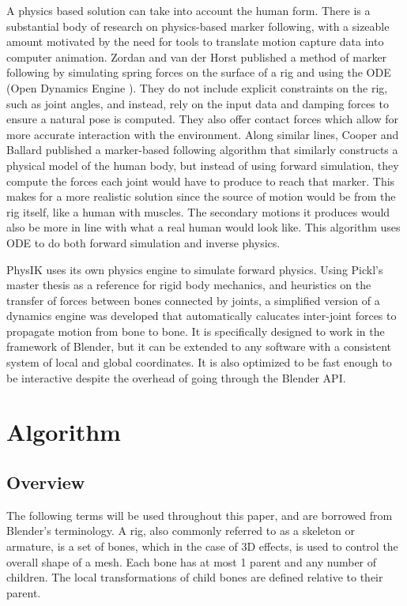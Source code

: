 \documentclass[10pt,twocolumn,letterpaper]{article}
\begin{document}
A physics based solution can take into account the human form. There is a substantial body of research on physics-based marker following, with a sizeable amount motivated by the need for tools to translate motion capture data into computer animation. Zordan and van der Horst \cite{Zo} published a method of marker following by simulating spring forces on the surface of a rig and using the ODE (Open Dynamics Engine \cite{Sm.R}). They do not include explicit constraints on the rig, such as joint angles, and instead, rely on the input data and damping forces to ensure a natural pose is computed. They also offer contact forces which allow for more accurate interaction with the environment. Along similar lines, Cooper and Ballard \cite{Co} published a marker-based following algorithm that similarly constructs a physical model of the human body, but instead of using forward simulation, they compute the forces each joint would have to produce to reach that marker. This makes for a more realistic solution since the source of motion would be from the rig itself, like a human with muscles. The secondary motions it produces would also be more in line with what a real human would look like. This algorithm uses ODE to do both forward simulation and inverse physics. 

PhysIK uses its own physics engine to simulate forward physics. Using Pickl's master thesis \cite{Pi} as a reference for rigid body mechanics, and heuristics on the transfer of forces between bones connected by joints, a simplified version of a dynamics engine was developed that automatically calucates inter-joint forces to propagate motion from bone to bone. It is specifically designed to work in the framework of Blender, but it can be extended to any software with a consistent system of local and global coordinates. It is also optimized to be fast enough to be interactive despite the overhead of going through the Blender API.

\section{Algorithm}

\subsection{Overview}

The following terms will be used throughout this paper, and are borrowed from Blender's terminology. A rig, also commonly referred to as a skeleton or armature, is a set of bones, which in the case of 3D effects, is used to control the overall shape of a mesh. Each bone has at most 1 parent and any number of children. The local transformations of child bones are defined relative to their parent.
\end{document}
